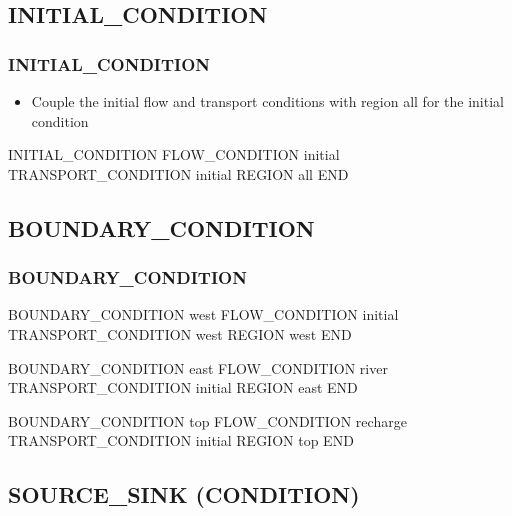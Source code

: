 \documentclass{beamer}
\newcommand\greencomment[1]{{{\color{green} #1}}}
\begin{document}
\subsection{INITIAL\_CONDITION}

\begin{frame}[fragile]\frametitle{INITIAL\_CONDITION}

\begin{itemize}
\item Couple the \greencomment{initial} flow and transport conditions with region \greencomment{all} for the initial condition
\end{itemize}

\begin{semiverbatim}

INITIAL_CONDITION
  FLOW_CONDITION initial
  TRANSPORT_CONDITION initial
  REGION all
END

\end{semiverbatim}

\end{frame}

\subsection{BOUNDARY\_CONDITION}

\begin{frame}\frametitle{BOUNDARY\_CONDITION}

\small
\begin{semiverbatim}
BOUNDARY_CONDITION west
  FLOW_CONDITION initial
  TRANSPORT_CONDITION west
  REGION west
END

BOUNDARY_CONDITION east
  FLOW_CONDITION river
  TRANSPORT_CONDITION initial
  REGION east
END

BOUNDARY_CONDITION top
  FLOW_CONDITION recharge
  TRANSPORT_CONDITION initial
  REGION top
END
\end{semiverbatim}

\end{frame}

\subsection{SOURCE\_SINK (CONDITION)}
\end{document}
